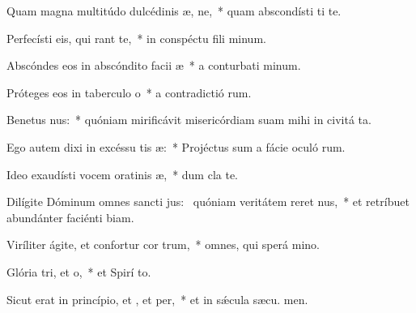 \item Quam magna multitúdo dulcédinis æ, ne,~* quam abscondísti ti te.
\item Perfecísti eis, qui rant  te,~* in conspéctu fili minum.
\item Abscóndes eos in abscóndito facii æ~* a conturbati minum.
\item Próteges eos in taberculo o~* a contradictió rum.
\item Benetus nus:~* quóniam mirificávit misericórdiam suam mihi in civitá ta.
\item Ego autem dixi in excéssu tis æ:~* Projéctus sum a fácie oculó rum.
\item Ideo exaudísti vocem oratinis æ,~* dum cla  te.
\item Dilígite Dóminum omnes sancti jus:~\pscross{} quóniam veritátem reret nus,~* et retríbuet abundánter faciénti biam.
\item Viríliter ágite, et confortur cor trum,~* omnes, qui sperá  mino.
\item Glória tri, et o,~* et Spirí to.
\item Sicut erat in princípio, et , et per,~* et in sǽcula sæcu. men.
